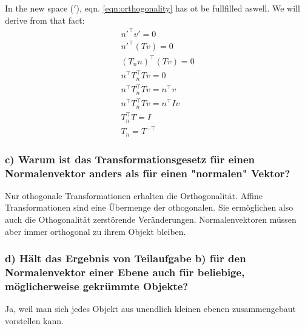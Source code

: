 \documentclass[a4paper,headings=small]{scrartcl}
\numberwithin{equation}{section} %
\numberwithin{figure}{section}   %
\begin{document}
In the new space ($'$),
eqn. \ref{eqn:orthogonality} has ot be fullfilled aswell.
We will derive from that fact:
\begin{align}
n'^{\top} v' = 0 \\
n'^{\top} (T v) = 0 \\
(T_n n)^{\top} (T v) = 0 \\
n^{\top} T_n^{\top} T v = 0 \\
n^{\top} T_n^{\top} T v = n^{\top} v \\
n^{\top} T_n^{\top} T v = n^{\top} I v \\
T_n^{\top} T = I \\
T_n = T^{-\top}
\end{align}

\subsubsection{c) Warum ist das Transformationsgesetz für einen Normalenvektor anders als für einen "normalen" Vektor?}
Nur othogonale Transformationen erhalten die Orthogonalität. Affine Transformationen sind eine Übermenge der othogonalen. Sie ermöglichen also auch die Othogonalität zerstörende Veränderungen. Normalenvektoren müssen aber immer orthogonal zu ihrem Objekt bleiben.

\subsubsection{d) Hält das Ergebnis von Teilaufgabe b) für den Normalenvektor einer Ebene auch für beliebige, möglicherweise gekrümmte Objekte?}
Ja, weil man sich jedes Objekt aus unendlich kleinen ebenen zusammengebaut vorstellen kann.
\end{document}
